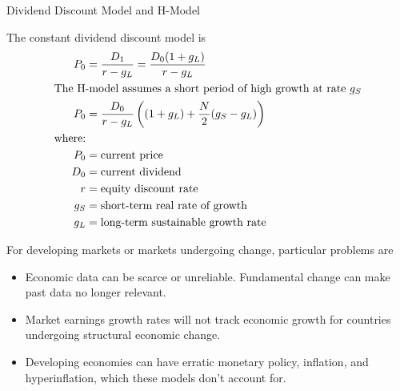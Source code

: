 \documentclass[../custom]{flashcards}
\begin{document}
\begin{flashcard}[\studyArea]{Dividend Discount Model and H-Model}
    \begin{flushleft}
        The constant dividend discount model is
        \begin{align*}
            P_0 &= \frac{D_1}{r - g_L} = \frac{D_0 (1 + g_L)}{r - g_L}\\
        \intertext{The H-model assumes a short period of high growth at rate $g_S$}
            P_0 &= \frac{D_0}{r - g_L} \left ( (1 + g_L) + \frac{N}{2}(g_S - g_L) \right )\\
            \text{where:}\\
            P_0 &= \text{current price}\\
            D_0 &= \text{current dividend}\\
            r &= \text{equity discount rate}\\
            g_S &= \text{short-term real rate of growth}\\
            g_L &= \text{long-term sustainable growth rate}
        \end{align*}

        For developing markets or markets undergoing change, particular problems are
        \begin{itemize}[nosep]
            \item Economic data can be scarce or unreliable. Fundamental change can make past data no longer relevant.
            \item Market earnings growth rates will not track economic growth for countries undergoing structural economic change.
            \item Developing economies can have erratic monetary policy, inflation, and hyperinflation, which these models don't account for.
        \end{itemize}
    \end{flushleft}
\end{flashcard}
\end{document}
